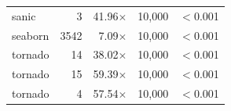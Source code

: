 \begin{table}[htbp]
\begin{tabularx}{\linewidth}{@{} >{\raggedright\arraybackslash}X r r r r @{}}
        sanic         & 3           & 41.96$\times$         & 10,000       & $<$0.001           \\
        seaborn       & 3542        & 7.09$\times$          & 10,000       & $<$0.001           \\
        tornado       & 14          & 38.02$\times$         & 10,000       & $<$0.001           \\
        tornado       & 15          & 59.39$\times$         & 10,000       & $<$0.001           \\
        tornado       & 4           & 57.54$\times$         & 10,000       & $<$0.001           \\
        \bottomrule
    \end{tabularx}
\end{table}

